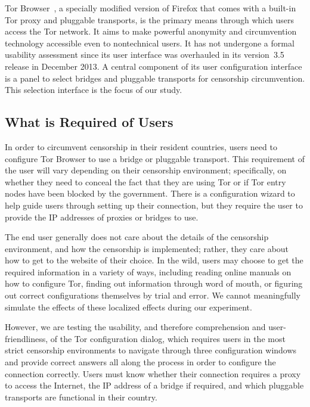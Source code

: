 \documentclass[letterpaper,twocolumn,11pt]{article}
\begin{document}
Tor Browser~\cite{tor-browser},
a specially modified version of Firefox that comes
with a built-in Tor proxy and pluggable transports,
is the primary means through which users access the Tor network.
It aims to make powerful anonymity and circumvention technology
accessible even to nontechnical users.
It has not undergone a formal usability assessment since
its user interface was overhauled in its version~3.5 release in December 2013.
A central component of its user configuration interface
is a panel to select bridges and pluggable transports
for censorship circumvention.
This selection interface is the focus of our study.

\subsection{What is Required of Users}
\indent \indent In order to circumvent censorship in their resident countries, users need to 
configure Tor Browser to use a bridge or pluggable transport. This requirement of the user will vary depending on their censorship
environment; specifically, on whether they need to conceal the fact that they are using Tor or if Tor entry nodes 
have been blocked by the government. There is a configuration wizard to help guide users through setting up their connection, but they require the user to provide the IP addresses of proxies or bridges to use.

The end user generally does not care about the details of the 
censorship environment, and how the censorship is implemented; rather, they care about how to get
to the website of their choice. In the wild, users may choose to get the required information in a variety 
of ways, including reading online manuals on how to configure Tor, finding out information through word of mouth, 
or figuring out correct configurations themselves by trial and error.  We cannot meaningfully simulate the effects
of these localized effects during our experiment.

However, we are testing the usability, and therefore comprehension and user-friendliness, of the Tor configuration 
dialog, which requires users in the most strict censorship environments to navigate through three configuration windows and provide correct answers all along the process in order to configure the connection correctly. Users must know
whether their connection requires a proxy to access the Internet, the IP address of a bridge if required, 
and which pluggable transports are functional in their country. 
\end{document}
